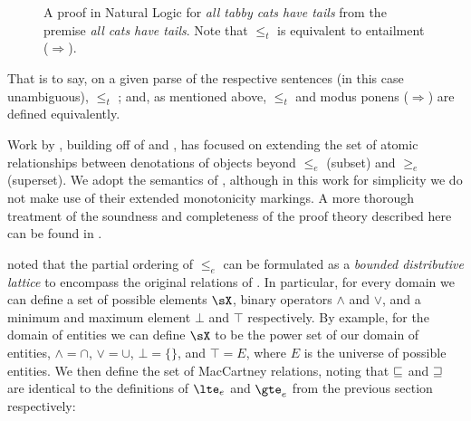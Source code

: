 \begin{figure*}
  \begin{prooftree}
  \end{prooftree}
\caption{\label{fig:catsproof}
  A proof in Natural Logic for \textit{all tabby cats have tails} from
    the premise \textit{all cats have tails}.
  Note that $\le_t$ is equivalent to entailment ($\Rightarrow$).
} 
\end{figure*}

That is to say, on a given parse of the respective sentences (in this
  case unambiguous),
   $\leq_t$ ;
  and, as mentioned above, $\leq_t$ and modus ponens ($\Rightarrow$)
  are defined equivalently.


Work by , building off of
   and
  ,
  has focused on extending the set of atomic relationships between
  denotations of objects beyond $\leq_e$ (subset) and $\geq_e$ (superset).
We adopt the semantics of , although in this
  work for simplicity we do not make use of their extended
  monotonicity markings.
A more thorough treatment of the soundness and completeness of the
  proof theory described here can be found in
  .

 noted that the partial ordering of
  $\leq_e$ can be formulated as a \textit{bounded distributive
  lattice} to encompass the original relations of
  .
In particular, for every domain we can define a set of possible 
  elements $\sX$, binary operators $\land$ and $\lor$,
  and a minimum and maximum element $\bot$ and $\top$ respectively.
By example, for the domain of entities we can define $\sX$ to be
  the power set of our domain of entities, $\land=\cap$,
  $\lor=\cup$, $\bot=\{\}$, and $\top=E$, where $E$ is the universe
  of possible entities.
We then define the set of MacCartney relations, noting that
  $\forward$ and $\reverse$ are identical to the definitions of
  $\lte_e$ and $\gte_e$ from the previous section respectively:

